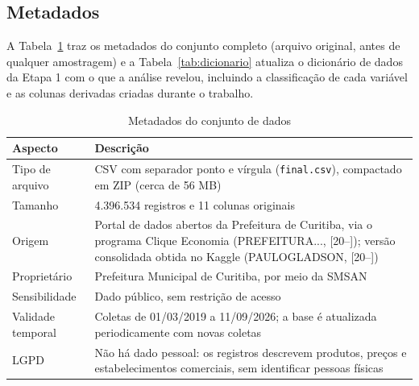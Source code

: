 \documentclass[11pt,a4paper]{article}
\newcommand{\col}[1]{\texttt{#1}}
\begin{document}
\subsection{Metadados}

A Tabela~\ref{tab:metadados} traz os metadados do conjunto completo (arquivo original, antes de qualquer amostragem) e a Tabela~\ref{tab:dicionario} atualiza o dicionário de dados da Etapa 1 com o que a análise revelou, incluindo a classificação de cada variável e as colunas derivadas criadas durante o trabalho.

\begin{table}[H]
\caption{Metadados do conjunto de dados}
\label{tab:metadados}
\small
\begin{tabularx}{\textwidth}{@{}p{3.6cm}X@{}}
\toprule
\textbf{Aspecto} & \textbf{Descrição} \\
\midrule
Tipo de arquivo & CSV com separador ponto e vírgula (\col{final.csv}), compactado em ZIP (cerca de 56 MB) \\
Tamanho & 4.396.534 registros e 11 colunas originais \\
Origem & Portal de dados abertos da Prefeitura de Curitiba, via o programa Clique Economia (PREFEITURA..., [20--]); versão consolidada obtida no Kaggle (PAULOGLADSON, [20--]) \\
Proprietário & Prefeitura Municipal de Curitiba, por meio da SMSAN \\
Sensibilidade & Dado público, sem restrição de acesso \\
Validade temporal & Coletas de 01/03/2019 a 11/09/2026; a base é atualizada periodicamente com novas coletas \\
LGPD & Não há dado pessoal: os registros descrevem produtos, preços e estabelecimentos comerciais, sem identificar pessoas físicas \\
\bottomrule
\end{tabularx}
\end{table}
\end{document}
